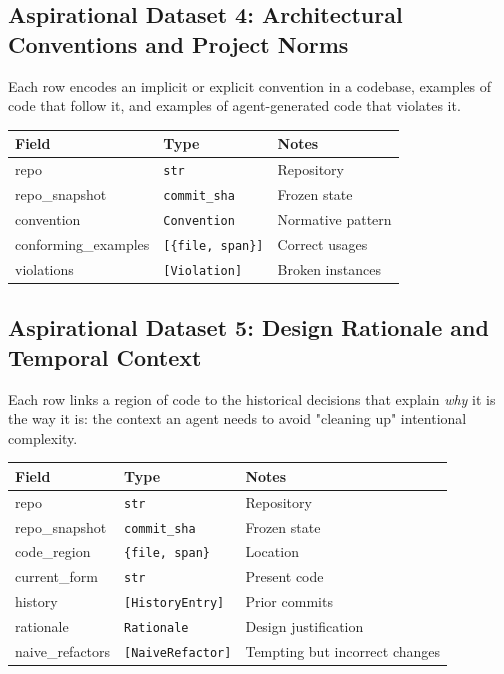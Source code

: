 \documentclass[a4paper,12pt]{article}
\begin{document}
\newpage
\subsection*{Aspirational Dataset 4: Architectural Conventions and Project Norms}

\noindent Each row encodes an implicit or explicit convention in a codebase, examples of code that follow it, and examples of agent-generated code that violates it.

\begin{tcolorbox}[title=ConventionSchema]
\footnotesize
\begin{tabularx}{\linewidth}{@{} l l Y @{}}
\toprule
\textbf{Field} & \textbf{Type} & \textbf{Notes} \\
\midrule
repo & \texttt{str} & Repository \\
repo\_snapshot & \texttt{commit\_sha} & Frozen state \\
convention & \texttt{Convention} & Normative pattern \\
conforming\_examples & \texttt{[\{file, span\}]} & Correct usages \\
violations & \texttt{[Violation]} & Broken instances \\
\bottomrule
\end{tabularx}
\end{tcolorbox}

\subsection*{Aspirational Dataset 5: Design Rationale and Temporal Context}

\noindent Each row links a region of code to the historical decisions that explain \textit{why} it is the way it is: the context an agent needs to avoid "cleaning up" intentional complexity.

\begin{tcolorbox}[title=CodeHistory]
\footnotesize
\begin{tabularx}{\linewidth}{@{} l l Y @{}}
\toprule
\textbf{Field} & \textbf{Type} & \textbf{Notes} \\
\midrule
repo & \texttt{str} & Repository \\
repo\_snapshot & \texttt{commit\_sha} & Frozen state \\
code\_region & \texttt{\{file, span\}} & Location \\
current\_form & \texttt{str} & Present code \\
history & \texttt{[HistoryEntry]} & Prior commits \\
rationale & \texttt{Rationale} & Design justification \\
naive\_refactors & \texttt{[NaiveRefactor]} & Tempting but incorrect changes \\
\bottomrule
\end{tabularx}
\end{tcolorbox}
\end{document}
